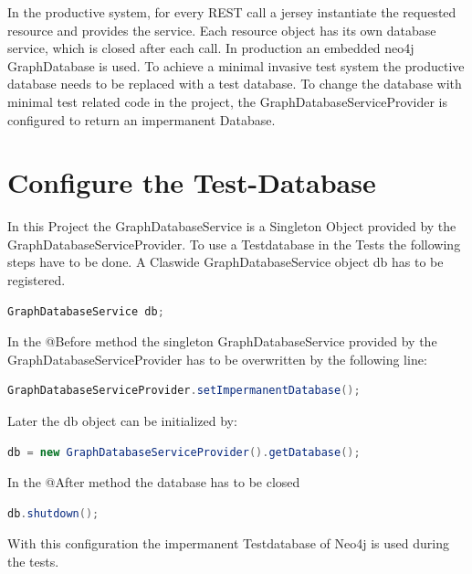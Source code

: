 \documentclass[11pt,fleqn,openany]{book} %
\begin{document}
In the productive system, for every REST call a jersey instantiate the requested resource and provides the service. Each resource object has its own database service, which is closed after each call. In production an embedded neo4j GraphDatabase is used. To achieve a minimal invasive test system the productive database needs to be replaced with a test database. To change the database with minimal test related code in the project, the GraphDatabaseServiceProvider is configured to return an impermanent Database.


\chapter{Configure the Test-Database}

In this Project the GraphDatabaseService is a Singleton Object provided by the GraphDatabaseServiceProvider. To use a Testdatabase in the Tests the following steps have to be done.
A Claswide GraphDatabaseService object db has to be registered.

\begin{lstlisting}[language=java]
    GraphDatabaseService db;
\end{lstlisting}
In the @Before method the singleton GraphDatabaseService provided by the GraphDatabaseServiceProvider has to be overwritten by the following line:

\begin{lstlisting}[language=java]
    GraphDatabaseServiceProvider.setImpermanentDatabase();
\end{lstlisting}
Later the db object can be initialized by:
\begin{lstlisting}[language=java]
    db = new GraphDatabaseServiceProvider().getDatabase();
\end{lstlisting}
In the @After method the database has to be closed
\begin{lstlisting}[language=java]
    db.shutdown();
\end{lstlisting}
With this configuration the impermanent Testdatabase of Neo4j is used during the tests. 
\end{document}
